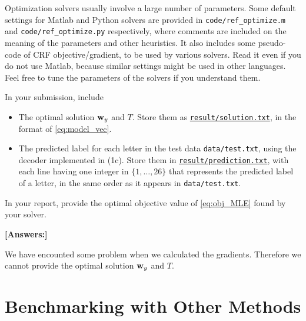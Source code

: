 \documentclass[11pt]{report}
\begin{document}
\begin{itemize}
	Optimization solvers usually involve a large number of parameters.
	Some default settings for Matlab and Python solvers are provided in \verb#code/ref_optimize.m# and \verb#code/ref_optimize.py# respectively,
	where comments are included on the meaning of the parameters and other heuristics.
	It also includes some pseudo-code of CRF objective/gradient,
	to be used by various solvers.
	Read it even if you do not use Matlab, because similar settings might be used in other languages.
	Feel free to tune the parameters of the solvers if you understand them.
	
	In your submission, include
	\begin{itemize}
		\item The optimal solution $\mathbf{\boldsymbol{w}}_y$ and $T$.  Store them as \underline{\tt{result/solution.txt}}, in the format of \eqref{eq:model_vec}.
		\item The predicted label for each letter in the test data \verb#data/test.txt#, using the decoder implemented in (1c).
		Store them in \underline{\tt{result/prediction.txt}},
		with each line having one integer in $\{1,\ldots, 26\}$ that represents the predicted label of a letter, in the same order as it appears in \verb#data/test.txt#.
	\end{itemize}
	In your report, provide the optimal objective value of \eqref{eq:obj_MLE} found by your solver.
\end{itemize}

{\bf [Answers:]} 

We have encounted some problem when we calculated the gradients. Therefore we cannot provide the optimal solution $\mathbf{\boldsymbol{w}}_y$ and $T$. 


\section{Benchmarking with Other Methods}
\end{document}
